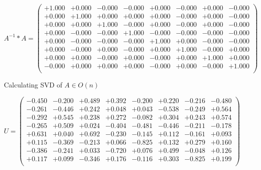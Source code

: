 \documentclass[9pt]{article}
\theoremstyle{plain}
\theoremstyle{definition}
\theoremstyle{remark}
\numberwithin{equation}{section}
\begin{document}
$A^{-1} *A = \left(
\begin{array}{
cccccccc}
+1.000 & +0.000 & -0.000 & -0.000 & +0.000 & -0.000 & +0.000 & -0.000 \\
+0.000 & +1.000 & +0.000 & +0.000 & +0.000 & -0.000 & +0.000 & -0.000 \\
+0.000 & +0.000 & +1.000 & -0.000 & +0.000 & -0.000 & +0.000 & -0.000 \\
+0.000 & -0.000 & -0.000 & +1.000 & -0.000 & -0.000 & -0.000 & -0.000 \\
+0.000 & -0.000 & -0.000 & -0.000 & +1.000 & +0.000 & -0.000 & -0.000 \\
+0.000 & -0.000 & +0.000 & -0.000 & +0.000 & +1.000 & -0.000 & +0.000 \\
+0.000 & +0.000 & -0.000 & +0.000 & -0.000 & +0.000 & +1.000 & +0.000 \\
-0.000 & +0.000 & +0.000 & +0.000 & -0.000 & +0.000 & -0.000 & +1.000 \\
\end{array}
\right)$ \newline 

Calculating SVD of  $A \in O(n)$

$U = \left(
\begin{array}{
cccccccc}
-0.450 & -0.200 & +0.489 & +0.392 & -0.200 & +0.220 & -0.216 & -0.480 \\
-0.261 & -0.446 & +0.242 & +0.048 & +0.043 & -0.538 & -0.249 & +0.564 \\
-0.292 & +0.545 & +0.238 & +0.272 & -0.082 & +0.304 & +0.243 & +0.574 \\
-0.265 & +0.509 & +0.024 & -0.404 & -0.481 & -0.446 & -0.211 & -0.178 \\
+0.631 & +0.040 & +0.692 & -0.230 & -0.145 & +0.112 & -0.161 & +0.093 \\
+0.115 & -0.369 & -0.213 & +0.066 & -0.825 & +0.132 & +0.279 & +0.160 \\
-0.386 & -0.241 & +0.033 & -0.720 & +0.076 & +0.499 & -0.048 & +0.126 \\
+0.117 & +0.099 & -0.346 & +0.176 & -0.116 & +0.303 & -0.825 & +0.199 \\
\end{array}
\right)$ \newline 
\end{document}
